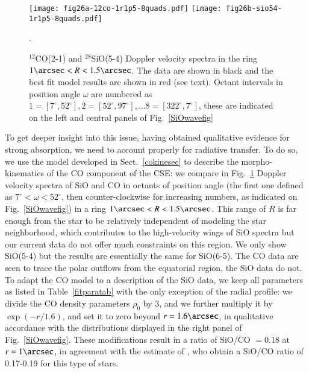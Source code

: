 \documentclass{aa}
\begin{document}
\begin{figure*}
  \centering
  \texttt{[image: fig26a-12co-1r1p5-8quads.pdf]}
  \texttt{[image: fig26b-sio54-1r1p5-8quads.pdf]}
  \caption{$^{12}$CO(2-1) and $^{28}$SiO(5-4) Doppler velocity spectra in 
    the ring
    $1\arcsec<R<1.5\arcsec$. The data are shown in black and the best fit
    model results are shown in red (see text). Octant intervals in
    position angle $\omega$ are numbered as $1=[7^\circ,52^\circ],
    2=[52^\circ,97^\circ], \dots 8=[322^\circ,7^\circ]$, these are indicated 
    on the left and central panels of Fig.~\ref{SiOwavefig}}.
  \label{COSiOobsmodfig}
\end{figure*}

To get deeper insight into this issue, having obtained qualitative
evidence for strong absorption, we need to account properly for
radiative transfer. To do so, we use the model developed in
Sect.~\ref{cokinesec} to describe the morpho-kinematics of the CO
component of the CSE: we compare in Fig.~\ref{COSiOobsmodfig} Doppler
velocity spectra of SiO and CO in octants of position angle (the first
one defined as $7^\circ<\omega<52^\circ$, then counter-clockwise for
increasing numbers, as indicated on Fig.~\ref{SiOwavefig}) in a ring
$1\arcsec<R<1.5\arcsec$.  This range of $R$ is far enough from the
star to be relatively independent of modeling the star neighborhood,
which contributes to the high-velocity wings of SiO spectra but our
current data do not offer much constraints on this region. We only
show SiO(5-4) but the results are essentially the same for
SiO(6-5). The CO data are seen to trace  the polar outflows from the
equatorial region, the SiO data do not. To adapt the CO model to a
description of the SiO data, we keep all parameters as listed in
Table~\ref{fitparatab} with the only exception of the radial profile:
we divide the CO density parameters $\rho_0$ by 3, and we further
multiply it by $\exp(-r/1.6)$, and set it to zero beyond
$r=1.6\arcsec$, in qualitative accordance with the distributions
displayed in the right panel of Fig.~\ref{SiOwavefig}. These
modifications  result in a ratio of SiO/CO $=0.18$ at $r=1\arcsec$, in
agreement with the estimate of \citet{vandesandeetal2018a}, who obtain
a SiO/CO ratio of 0.17-0.19 for this type of stars.
  
\end{document}
